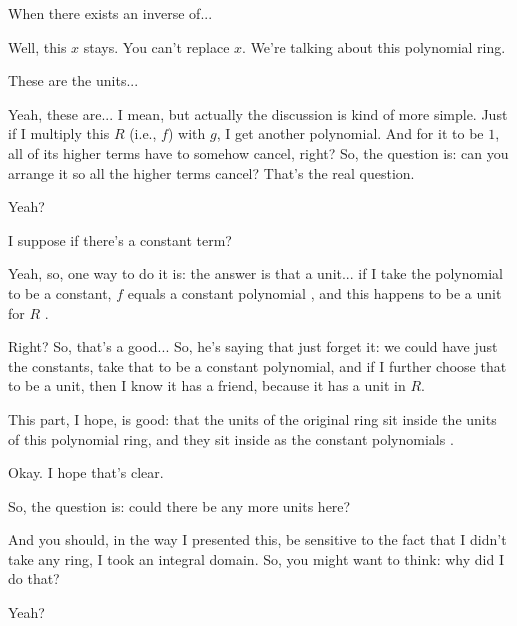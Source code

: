 \begin{student}
When there exists an inverse of...
\end{student}

\begin{speech}[00:18:27 - 00:18:31]
Well, this $x$ stays. You can't replace $x$. We're talking about this polynomial ring.
\end{speech}

\begin{student}
These are the units...
\end{student}

\begin{speech}[00:18:33 - 00:18:56]
Yeah, these are... I mean, but actually the discussion is kind of more simple. Just if I multiply this $R$ (i.e., $f$) with $g$, I get another polynomial. And for it to be $1$, all of its higher terms have to somehow cancel, right? So, the question is: can you arrange it so all the higher terms cancel? That's the real question.

Yeah?
\end{speech}

\begin{student}
I suppose if there's a constant term?
\end{student}

\begin{speech}[00:18:59 - 00:20:09]
Yeah, so, one way to do it is: the answer is that a unit... if I take the polynomial to be a constant, $f$ equals a constant polynomial , and this happens to be a unit for $R$ .

Right? So, that's a good... So, he's saying that just forget it: we could have just the constants, take that to be a constant polynomial, and if I further choose that to be a unit, then I know it has a friend, because it has a unit in $R$.

This part, I hope, is good: that the units of the original ring sit inside the units of this polynomial ring, and they sit inside as the constant polynomials .

Okay. I hope that's clear.

So, the question is: could there be any more units here?

And you should, in the way I presented this, be sensitive to the fact that I didn't take any ring, I took an integral domain. So, you might want to think: why did I do that?

Yeah?
\end{speech}

